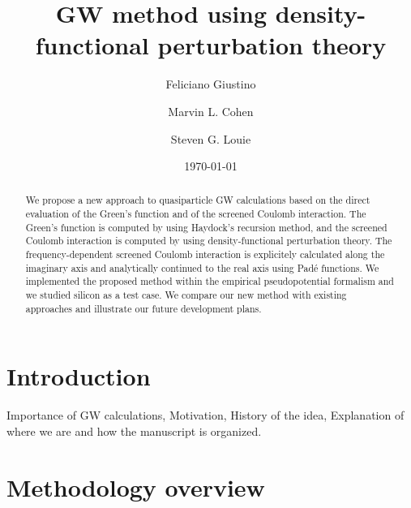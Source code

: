 \documentclass[twocolumn,prb,showpacs,superscriptaddress]{revtex4}
\begin{document}
\title{GW method using density-functional perturbation theory}

\author{Feliciano Giustino}
\author{Marvin L. Cohen}
\author{Steven G. Louie}
\date{\today}

\begin{abstract}
We propose a new approach to quasiparticle GW calculations based on the
direct evaluation of the Green's function and of the screened Coulomb interaction.
The Green's function is computed by using Haydock's recursion method,
and the screened Coulomb interaction is computed by using density-functional
perturbation theory. The frequency-dependent screened Coulomb interaction 
is explicitely calculated along the imaginary axis and analytically continued 
to the real axis using Pad\'e functions. We implemented the
proposed method within the empirical pseudopotential formalism and 
we studied silicon as a test case. We compare our new method with existing
approaches and illustrate our future development plans.
\end{abstract}


\maketitle

\section{Introduction}

Importance of GW calculations, Motivation, History of the idea,
Explanation of where we are and how the manuscript is organized.

\section{Methodology overview}
\end{document}
